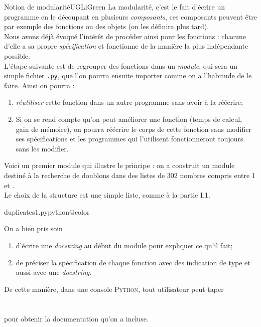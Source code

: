 \documentclass[a4paper,12pt,french]{book}
\begin{document}
\begin{encadrecolore}{Notion de modularité}{UGLiGreen}
La modularité, c'est le fait d'écrire un programme en le découpant en plusieurs \textit{composants}, ces composants peuvent être par exemple des fonctions ou des objets (on les définira plus tard).\\
Nous avons déjà évoqué l'intérêt de procéder ainsi pour les fonctions : chacune d'elle a sa propre \textit{spécification} et fonctionne de la manière la plus indépendante possible.\\

L'étape suivante est de regrouper des fonctions dans un \textit{module}, qui sera un simple fichier \texttt{.py}, que l'on pourra ensuite importer comme on a l'habitude de le faire.
Ainsi on pourra :
\begin{enumerate}[--]
	\item 	\textit{réutiliser} cette fonction dans un autre programme sans avoir à la réécrire;
	\item 	Si on se rend compte qu'on peut améliorer une fonction (temps de calcul, gain de mémoire), on pourra réécrire le corps de cette fonction sans modifier ses spécifications et les programmes qui l'utilisent fonctionneront toujours sans les modifier.
\end{enumerate}
\end{encadrecolore}

Voici un premier module qui illustre le principe : on a construit un module destiné à la recherche de doublons dans des listes de 302 nombres compris entre 1 et .\\
Le choix de la structure  est une simple liste, comme à la partie \textsc{I}.1.

\begin{encadrecolore}{duplicates1.py}{python@color}
\end{encadrecolore}

\begin{remarque}[]
	On a bien pris soin
	\begin{enumerate}[--]
		\item 	d'écrire une \textit{docstring} au début du module pour expliquer ce qu'il fait;
		\item 	de préciser la spécification de chaque fonction avec des indication de type et aussi avec une \textit{docstring}.
	\end{enumerate}
	De cette manière, dans une console \textsc{Python}, tout utilisateur peut taper\\
	\\
	\\
	pour obtenir la documentation qu'on a incluse.
\end{remarque}
\end{document}
